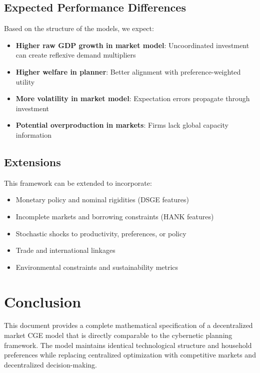 \documentclass[12pt,a4paper]{article}
\theoremstyle{definition}
\theoremstyle{remark}
\begin{document}
\subsection{Expected Performance Differences}

Based on the structure of the models, we expect:

\begin{itemize}
    \item \textbf{Higher raw GDP growth in market model}: Uncoordinated investment can create reflexive demand multipliers
    \item \textbf{Higher welfare in planner}: Better alignment with preference-weighted utility
    \item \textbf{More volatility in market model}: Expectation errors propagate through investment
    \item \textbf{Potential overproduction in markets}: Firms lack global capacity information
\end{itemize}

\subsection{Extensions}

This framework can be extended to incorporate:
\begin{itemize}
    \item Monetary policy and nominal rigidities (DSGE features)
    \item Incomplete markets and borrowing constraints (HANK features)
    \item Stochastic shocks to productivity, preferences, or policy
    \item Trade and international linkages
    \item Environmental constraints and sustainability metrics
\end{itemize}

\section{Conclusion}

This document provides a complete mathematical specification of a decentralized market CGE model that is directly comparable to the cybernetic planning framework. The model maintains identical technological structure and household preferences while replacing centralized optimization with competitive markets and decentralized decision-making.
\end{document}
